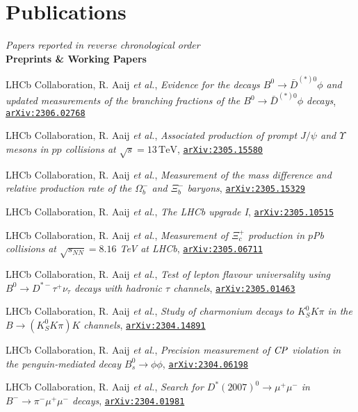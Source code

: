 \documentclass[a4paper, 11pt]{article}
\newenvironment{cvcontent}{
  \leftskip=0.5cm\rightskip=0cm
  \noindent\ignorespaces}{\par}
\newcommand{\journal}[1]{\textbf{\large #1}\\\vspace{-4mm}}
\newcommand{\arxiv}[1]{\href{https://arxiv.org/abs/#1}{\texttt{arXiv:#1}}}
\begin{document}
\section*{Publications}
\begin{cvcontent}
  \emph{Papers reported in reverse chronological order}\\[4mm]
  \journal{Preprints \& Working Papers}
  \begin{enumerate}[label={[\arabic*]}, leftmargin=1.5cm]
    \item LHCb Collaboration, R. Aaij \emph{et al.},
    \emph{Evidence for the decays $B^{0}\rightarrow\bar{D}^{(*)0}\phi$ and updated measurements of the branching fractions of the $B^{0}\rightarrow\bar{D}^{(*)0}\phi$ decays},
    \arxiv{2306.02768}
    \item LHCb Collaboration, R. Aaij \emph{et al.},
    \emph{Associated production of prompt $J/\psi$ and $\mathit{\Upsilon}$ mesons in $pp$ collisions at $\sqrt{s}=13\,\mathrm{TeV}$},
    \arxiv{2305.15580}
    \item LHCb Collaboration, R. Aaij \emph{et al.},
    \emph{Measurement of the mass difference and relative production rate of the $\Omega^-_b$ and $\Xi^-_b$ baryons},
    \arxiv{2305.15329}
    \item LHCb Collaboration, R. Aaij \emph{et al.},
    \emph{The LHCb upgrade I},
    \arxiv{2305.10515}
    \item LHCb Collaboration, R. Aaij \emph{et al.},
    \emph{Measurement of $\Xi_{c}^{+}$ production in $p$Pb collisions at $\sqrt{s_{NN}}=8.16$ TeV at LHCb},
    \arxiv{2305.06711}
    \item LHCb Collaboration, R. Aaij \emph{et al.},
    \emph{Test of lepton flavour universality using $B^0 \to D^{*-}\tau^+\nu_{\tau}$ decays with hadronic $\tau$ channels},
    \arxiv{2305.01463}
    \item LHCb Collaboration, R. Aaij \emph{et al.},
    \emph{Study of charmonium decays to $K^0_S K \pi$ in the $B \to (K^0_S K \pi) K$ channels},
    \arxiv{2304.14891}
    \item LHCb Collaboration, R. Aaij \emph{et al.},
    \emph{Precision measurement of $\it{CP} $ violation in the penguin-mediated decay $B_s^{0}\rightarrow\phi\phi$},
    \arxiv{2304.06198}
    \item LHCb Collaboration, R. Aaij \emph{et al.},
    \emph{Search for $D^{*}(2007)^0\to\mu^+\mu^-$ in $B^-\to\pi^-\mu^+\mu^-$ decays},
    \arxiv{2304.01981}

\end{enumerate}
\end{cvcontent}
\end{document}
